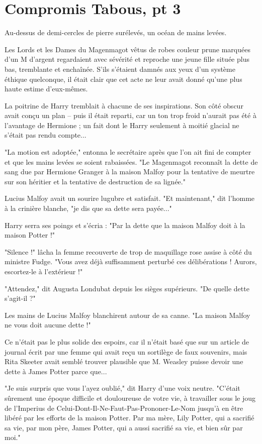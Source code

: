 
\chapter{Compromis Tabous, pt 3}

Au-dessus de demi-cercles de pierre surélevés, un océan de mains levées.

Les Lords et les Dames du Magenmagot vêtus de robes couleur prune marquées d'un M d'argent regardaient avec sévérité et reproche une jeune fille située plus bas, tremblante et enchaînée. S'ils s'étaient damnés aux yeux d'un système éthique quelconque, il était clair que cet acte ne leur avait donné qu'une plus haute estime d'eux-mêmes.

La poitrine de Harry tremblait à chacune de ses inspirations. Son côté obscur avait conçu un plan – puis il était reparti, car un ton trop froid n'aurait pas été à l'avantage de Hermione ; un fait dont le Harry seulement à moitié glacial ne s'était pas rendu compte...

"La motion est adoptée," entonna le secrétaire après que l'on ait fini de compter et que les mains levées se soient rabaissées. "Le Magenmagot reconnaît la dette de sang due par Hermione Granger à la maison Malfoy pour la tentative de meurtre sur son héritier et la tentative de destruction de sa lignée."

Lucius Malfoy avait un sourire lugubre et satisfait. "Et maintenant," dit l'homme à la crinière blanche, "je dis que sa dette sera payée..."

Harry serra ses poings et s'écria : "Par la dette que la maison Malfoy doit à la maison Potter !"

"Silence !" lâcha la femme recouverte de trop de maquillage rose assise à côté du ministre Fudge. "Vous avez déjà suffisamment perturbé ces délibérations ! Aurors, escortez-le à l'extérieur !"

"Attendez," dit Augusta Londubat depuis les sièges supérieurs. "De quelle dette s'agit-il ?"

Les mains de Lucius Malfoy blanchirent autour de sa canne. "La maison Malfoy ne vous doit aucune dette !"

Ce n'était pas le plus solide des espoirs, car il n'était basé que sur un article de journal écrit par une femme qui avait reçu un sortilège de faux souvenirs, mais Rita Skeeter avait semblé trouver plausible que M. Weasley puisse devoir une dette à James Potter parce que...

"Je suis surpris que vous l'ayez oublié," dit Harry d'une voix neutre. "C'était sûrement une époque difficile et douloureuse de votre vie, à travailler sous le joug de l'Imperius de Celui-Dont-Il-Ne-Faut-Pas-Prononer-Le-Nom jusqu'à en être libéré par les efforts de la maison Potter. Par ma mère, Lily Potter, qui a sacrifié sa vie, par mon père, James Potter, qui a aussi sacrifié sa vie, et bien sûr par moi."

